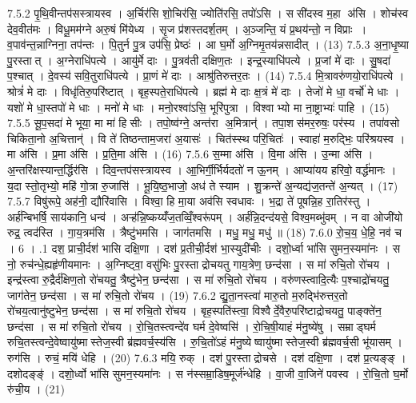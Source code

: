7.5.2
पृ॒थि॒वीन्तप॑सस्त्रायस्व । अ॒र्चिर॑सि शो॒चिर॑सि॒ ज्योति॑रसि॒ तपो॑ऽसि । ससी॑दस्व म॒हा अ॑सि । शोच॑स्व देव॒वीत॑मः । विधू॒मम॑ग्ने अरु॒षं मि॑येध्य । सृ॒ज प्र॑शस्तदर्\mbox{}श॒तम् । अ॒ञ्जन्ति॒ यं प्र॒थय॑न्तो॒ न विप्राः । व॒पाव॑न्त॒न्नाग्निना॒ तप॑न्तः । पि॒तुर्न पु॒त्र उप॑सि॒ प्रेष्ठः॑ । आ घ॒र्मो अ॒ग्निमृ॒तय॑न्नसादीत् । (13)
7.5.3
अ॒ना॒धृ॒ष्या पु॒रस्तात् । अ॒ग्नेराधि॑पत्ये । आयु॑र्मे दाः । पु॒त्रव॑ती दक्षिण॒तः । इन्द्र॒स्याधि॑पत्ये । प्र॒जां मे॑ दाः । सु॒षदा॑ प॒श्चात् । दे॒वस्य॑ सवि॒तुराधि॑पत्ये । प्रा॒णं मे॑ दाः । आश्रु॑तिरुत्तर॒तः । (14)
7.5.4
मि॒त्रावरु॑णयो॒राधि॑पत्ये । श्रोत्रं॑ मे दाः । विधृ॑तिरु॒परि॑ष्टात् । बृह॒स्पते॒राधि॑पत्ये । ब्रह्म॑ मे दाः क्ष॒त्रं मे॑ दाः । तेजो॑ मे धा॒ वर्चो॑ मे धाः । यशो॑ मे धा॒स्तपो॑ मे धाः । मनो॑ मे धाः । मनो॒रश्वा॑ऽसि॒ भूरि॑पुत्रा । विश्वाभ्यो मा ना॒ष्ट्राभ्यः॑ पाहि । (15)
7.5.5
सू॒प॒सदा॑ मे भूया॒ मा मा॑ हिसीः । तपो॒ष्व॑ग्ने॒ अन्त॑रा अ॒मित्रान्॑ । तपा॒शस॑मर॒रुषः॒ पर॑स्य । तपा॑वसो चिकिता॒नो अ॒चित्तान्॑ । वि ते॑ तिष्ठन्ताम॒जरा॑ अ॒यासः॑ । चित॑स्स्थ परि॒चितः॑ । स्वाहा॑ म॒रुद्भिः॒ परि॑श्रयस्व । मा अ॑सि । प्र॒मा अ॑सि । प्र॒ति॒मा अ॑सि । (16)
7.5.6
स॒म्मा अ॑सि । वि॒मा अ॑सि । उ॒न्मा अ॑सि । अ॒न्तरि॑क्षस्यान्त॒र्द्धिर॑सि । दिव॒न्तप॑सस्त्रायस्व । आ॒भिर्गी॒र्भिर्यदतो॑ न ऊ॒नम् । आप्या॑यय हरिवो॒ वर्द्ध॑मानः । य॒दा स्तो॒तृभ्यो॒ महि॑ गो॒त्रा रु॒जासि॑ । भू॒यि॒ष्ठ॒भाजो॒ अध॑ ते स्याम । शु॒क्रन्ते॑ अ॒न्यद्य॑ज॒तन्ते॑ अ॒न्यत् । (17)
7.5.7
विषु॑रूपे॒ अह॑नी॒ द्यौरि॑वासि । विश्वा॒ हि मा॒या अव॑सि स्वधावः । भ॒द्रा ते॑ पूषन्नि॒ह रा॒तिर॑स्तु । अर्\mbox{}ह॑न्बिभर्\mbox{}षि॒ साय॑कानि॒ धन्व॑ । अऱ्ह॑न्नि॒ष्कय्यँ॑ज॒तव्विँ॒श्वरू॑पम् । अर्\mbox{}ह॑न्नि॒दन्द॑यसे॒ विश्व॒मब्भु॑वम् । न वा ओजी॑यो रुद्र॒ त्वद॑स्ति । गा॒य॒त्रम॑सि । त्रैष्टु॑भमसि । जाग॑तमसि । मधु॒ मधु॒ मधु॑ ॥ (18)
7.6.0
रो॒च॒य॒ धे॒हि॒ नव॑ च । 6 ।
.1
दश॒ प्राची॒र्दश॑ भासि दक्षि॒णा । दश॑ प्र॒तीची॒र्दश॑ भा॒स्युदी॑चीः । दशो॒र्ध्वा भा॑सि सुमन॒स्यमा॑नः । स नो॒ रुच॑न्धे॒ह्यहृ॑णीयमानः । अ॒ग्निष्ट्वा॒ वसु॑भिः पु॒रस्ताद्रोचयतु गाय॒त्रेण॒ छन्द॑सा । स मा॑ रुचि॒तो रो॑चय । इन्द्र॑स्त्वा रु॒द्रैर्द॑क्षिण॒तो रो॑चयतु॒ त्रैष्टु॑भेन॒ छन्द॑सा । स मा॑ रुचि॒तो रो॑चय । वरु॑णस्त्वादि॒त्यैः प॒श्चाद्रो॑चयतु॒ जाग॑तेन॒ छन्द॑सा । स मा॑ रुचि॒तो रो॑चय । (19)
7.6.2
द्यु॒ता॒नस्त्वा॑ मारु॒तो म॒रुद्भि॑रुत्तर॒तो रो॑चय॒त्वानु॑ष्टुभेन॒ छन्द॑सा । स मा॑ रुचि॒तो रो॑चय । बृह॒स्पति॑स्त्वा॒ विश्वैर्दे॒वैरु॒परि॑ष्टाद्रोचयतु॒ पाङ्क्ते॑न॒ छन्द॑सा । स मा॑ रुचि॒तो रो॑चय । रो॒चि॒तस्त्वन्दे॑व घर्म दे॒वेष्वसि॑ । रो॒चि॒षी॒याहं म॑नु॒ष्ये॑षु । सम्राड्घर्म रुचि॒तस्त्वन्दे॒वेष्वायु॑ष्मास्तेज॒स्वी ब्र॑ह्मवर्च॒स्य॑सि । रु॒चि॒तो॑ऽहं म॑नु॒ष्येष्वायु॑ष्मास्तेज॒स्वी ब्र॑ह्मवर्च॒सी भू॑यासम् । रुग॑सि । रुचं॒ मयि॑ धेहि । (20)
7.6.3
मयि॒ रुक् । दश॑ पु॒रस्ताद्रोचसे । दश॑ दक्षि॒णा । दश॑ प्र॒त्यङ्ङ् । दशोदङ्ङ्॑ । दशो॒र्ध्वो भा॑सि सुमन॒स्यमा॑नः । स न॑स्सम्रा॒डिष॒मूर्ज॑न्धेहि । वा॒जी वा॒जिने॑ पवस्व । रो॒चि॒तो घ॒र्मो रु॑ची॒य । (21)
